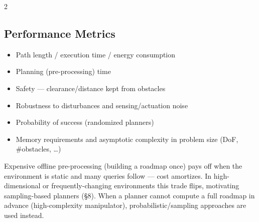 \documentclass[10pt,a4paper]{article}
\begin{document}
\begin{multicols}{2}
\subsection{Performance Metrics}

\begin{itemize}
\item Path length / execution time / energy consumption
\item Planning (pre-processing) time
\item Safety --- clearance/distance kept from obstacles
\item Robustness to disturbances and sensing/actuation noise
\item Probability of success (randomized planners)
\item Memory requirements and asymptotic complexity in problem size (DoF, \#obstacles, \dots)
\end{itemize}
\begin{notebox}
Expensive offline pre-processing (building a roadmap once) pays off when the environment is static and many queries follow --- cost amortizes. In high-dimensional or frequently-changing environments this trade flips, motivating sampling-based planners (\S8). When a planner cannot compute a full roadmap in advance (high-complexity manipulator), probabilistic/sampling approaches are used instead.
\end{notebox}


\end{multicols}
\end{document}
